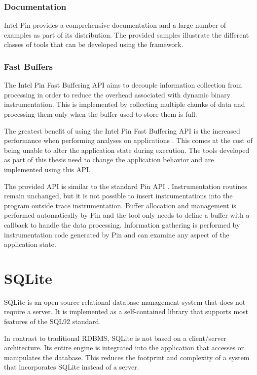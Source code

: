 \subsubsection{Documentation}

Intel Pin provides a comprehensive documentation \cite{pindoc} and a large number of examples as part of its distribution. The provided samples illustrate the different classes of tools that can be developed using the framework.

\subsubsection{Fast Buffers}

The Intel Pin Fast Buffering API \cite{pinbuffer} aims to decouple information collection from processing in order to reduce the overhead associated with dynamic binary instrumentation. This is implemented by collecting multiple chunks of data and processing them only when the buffer used to store them is full.

The greatest benefit of using the Intel Pin Fast Buffering API is the increased performance when performing analyses on applications \cite{pinbuffer}. This comes at the cost of being unable to alter the application state during execution. The tools developed as part of this thesis need to change the application behavior and are implemented using this API.

The provided API is similar to the standard Pin API \cite{pindoc}. Instrumentation routines remain unchanged, but it is not possible to insert instrumentations into the program outside trace instrumentation. Buffer allocation and management is performed automatically by Pin and the tool only needs to define a buffer with a callback to handle the data processing. Information gathering is performed by instrumentation code generated by Pin and can examine any aspect of the application state.

\section{SQLite}

SQLite \cite{sqlitebook} is an open-source relational database management system that does not require a server. It is implemented as a self-contained library that supports most features of the SQL92 standard.

In contrast to traditional RDBMS, SQLite is not based on a client/server architecture. Its entire engine is integrated into the application that accesses or manipulates the database. This reduces the footprint and complexity of a system that incorporates SQLite instead of a server.

